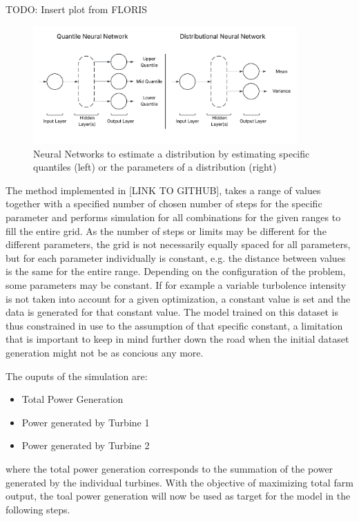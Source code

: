 TODO: Insert plot from FLORIS
\begin{figure}[h] 
	\centering
	\includegraphics[width=0.9\textwidth]{figures/modelling/quantile_dist_nn.png} 
	\caption{Neural Networks to estimate a distribution by estimating specific quantiles (left) or the parameters of a distribution (right)}
	\label{fig:quantile_dist_nn}
\end{figure}

The method implemented in [LINK TO GITHUB], takes a range of values together with a specified number of chosen number of steps for the specific parameter and performs simulation for all combinations for the given ranges to fill the entire grid. As the number of steps or limits may be different for the different parameters, the grid is not necessarily equally spaced for all parameters, but for each parameter individually is constant, e.g. the distance between values is the same for the entire range.  
Depending on the configuration of the problem, some parameters may be constant. If for example a variable turbolence intensity is not taken into account for a given optimization, a constant value is set and the data is generated for that constant value. The model trained on this dataset is thus constrained in use to the assumption of that specific constant, a limitation that is important to keep in mind further down the road when the initial dataset generation might not be as concious any more. 

The ouputs of the simulation are:
\begin{itemize}
	\item Total Power Generation
	\item Power generated by Turbine 1
	\item Power generated by Turbine 2
\end{itemize}

where the total power generation corresponds to the summation of the power generated by the individual turbines. With the objective of maximizing total farm output, the toal power generation will now be used as target for the model in the following steps.


